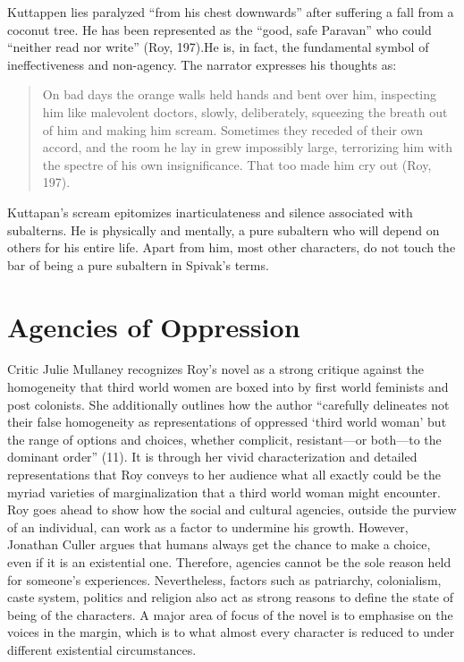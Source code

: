 Kuttappen lies paralyzed “from his chest downwards” after suffering a fall from a coconut tree.  He has been represented as the “good, safe Paravan” who could “neither read nor write” (Roy, 197).He is, in fact, the fundamental symbol of ineffectiveness and non-agency. The narrator expresses his thoughts as: 

\begin{quote}
  On bad days the orange walls held hands and bent over him, inspecting him like malevolent doctors, slowly, deliberately, squeezing the breath out of him and making him scream. Sometimes they receded of their own accord, and the room he lay in grew impossibly large, terrorizing him with the spectre of his own insignificance. That too made him cry out (Roy, 197).
\end{quote}

Kuttapan’s scream epitomizes inarticulateness and silence associated with subalterns. He is physically and mentally, a pure subaltern who will depend on others for his entire life. Apart from him, most other characters, do not touch the bar of being a pure subaltern in Spivak’s terms. 

\section{Agencies of Oppression}

Critic Julie Mullaney recognizes Roy’s novel as a strong critique against the homogeneity that third world women are boxed into by first world feminists and post colonists. She additionally outlines how the author “carefully delineates not their false homogeneity as representations of oppressed ‘third world woman’ but the range of options and choices, whether complicit, resistant—or both—to the dominant order” (11). It is through her vivid characterization and detailed representations that Roy conveys to her audience what all exactly could be the myriad varieties of marginalization that a third world woman might encounter. Roy goes ahead to show how the social and cultural agencies, outside the purview of an individual, can work as a factor to undermine his growth. However, Jonathan Culler argues that humans always get the chance to make a choice, even if it is an existential one. Therefore, agencies cannot be the sole reason held for someone’s experiences. Nevertheless, factors such as patriarchy, colonialism, caste system, politics and religion also act as strong reasons to define the state of being of the characters. A major area of focus of the novel is to emphasise on the voices in the margin, which is to what almost every character is reduced to under different existential circumstances. 

